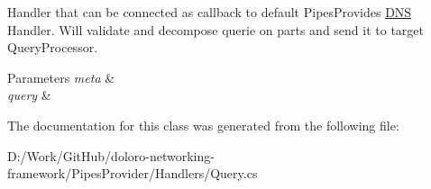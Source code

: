 Handler that can be connected as callback to default Pipes\+Provides \mbox{\hyperlink{class_pipes_provider_1_1_handlers_1_1_d_n_s}{D\+NS}} Handler. Will validate and decompose querie on parts and send it to target Query\+Processor. 


\begin{DoxyParams}{Parameters}
{\em meta} & \\
\hline
{\em query} & \\
\hline
\end{DoxyParams}


The documentation for this class was generated from the following file\+:\begin{DoxyCompactItemize}
\item 
D\+:/\+Work/\+Git\+Hub/doloro-\/networking-\/framework/\+Pipes\+Provider/\+Handlers/Query.\+cs\end{DoxyCompactItemize}
